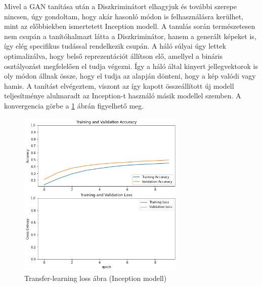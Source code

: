 
Mivel a GAN tanítása után a Diszkriminátort elhagyjuk és további szerepe nincsen, úgy gondoltam, hogy akár hasonló módon is felhasználásra kerülhet, mint az előbbiekben ismertetett Inception modell. A tanulás során természetesen nem csupán a tanítóhalmazt látta a Diszkriminátor, hanem a generált képeket is, így elég specifikus tudással rendelkezik csupán. A háló súlyai úgy lettek optimalizálva, hogy belső reprezentációt állítson elő, amellyel a bináris osztályozást megfelelően el tudja végezni. Így a háló által kinyert jellegvektorok is oly módon állnak össze, hogy el tudja az alapján dönteni, hogy a kép valódi vagy hamis. A tanítást elvégeztem, viszont az így kapott összeállított új modell teljesítménye alulmaradt az Inception-t használó másik modellel szemben. A konvergencia görbe a \ref{fig:transfer_learning_loss_discriminator} ábrán figyelhető meg.

\begin{figure}[h]
	\centering
	\includegraphics[width=8cm]{images/transfer_discriminator.png}
	\caption{Transfer-learning loss ábra (Inception modell)}
	\label{fig:transfer_learning_loss_discriminator}
\end{figure}


